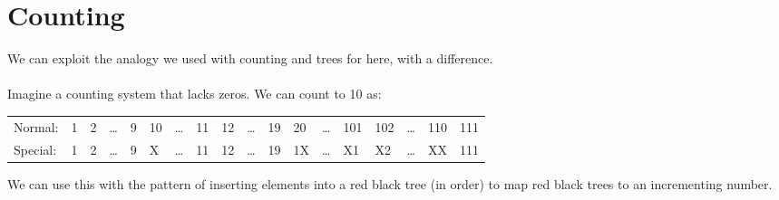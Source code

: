 \documentclass{report}
\begin{document}
    \section*{Counting}
        We can exploit the analogy we used with counting and trees for  here, with a difference.
        \\
        \\ Imagine a counting system that lacks zeros. We can count to 10 as:
        \begin{center}
            \begin{tabular}{l l l l l l l l l l l l l l l l l l}
                Normal:  & 1 & 2 & \dots & 9 & 10 & \dots & 11 & 12 & \dots & 19 & 20 & \dots & 101 & 102 & \dots & 110 & 111 \\
                Special: & 1 & 2 & \dots & 9 & X  & \dots & 11 & 12 & \dots & 19 & 1X & \dots & X1  & X2  & \dots & XX  & 111 \\
            \end{tabular}
        \end{center}
        We can use this with the pattern of inserting elements into a red black tree (in order) to map red black trees to an incrementing number.
\end{document}
